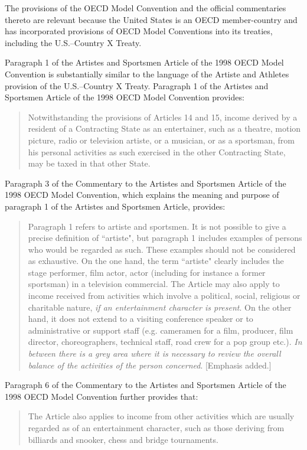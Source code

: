 \begin{select}
The provisions of the OECD Model Convention and the official commentaries
thereto are relevant because the United States is an OECD member-country and
has incorporated provisions of OECD Model Conventions into its treaties, including
the U.S.--Country X Treaty. 

Paragraph 1 of the Artistes and Sportsmen Article of the 1998 OECD Model
Convention is substantially similar to the language of the Artiste and Athletes
provision of the U.S.--Country X Treaty. Paragraph 1 of the Artistes and Sportsmen
Article of the 1998 OECD Model Convention provides:
\begin{quotation}
Notwithstanding the provisions of Articles 14 and 15, income derived by a
resident of a Contracting State as an entertainer, such as a theatre, motion
picture, radio or television artiste, or a musician, or as a sportsman, from his
personal activities as such exercised in the other Contracting State, may be
taxed in that other State. 
\end{quotation}
Paragraph 3 of the Commentary to the Artistes and Sportsmen Article of the 1998
OECD Model Convention, which explains the meaning and purpose of paragraph 1
of the Artistes and Sportsmen Article, provides:
\begin{quotation}
Paragraph 1 refers to artiste and sportsmen. It is not possible to give a
precise definition of ``artiste", but paragraph 1 includes examples of persons
who would be regarded as such. These examples should not be considered
as exhaustive. On the one hand, the term ``artiste" clearly includes the stage
performer, film actor, actor (including for instance a former sportsman) in a
television commercial. The Article may also apply to income received from
activities which involve a political, social, religious or charitable nature, \emph{if an
entertainment character is present}. On the other hand, it does not extend to
a visiting conference speaker or to administrative or support staff (e.g.
cameramen for a film, producer, film director, choreographers, technical staff,
road crew for a pop group etc.). \emph{In between there is a grey area where it is
necessary to review the overall balance of the activities of the person
concerned}. [Emphasis added.]
\end{quotation}

Paragraph 6 of the Commentary to the Artistes and Sportsmen Article of the 1998
OECD Model Convention further provides that:
\begin{quotation}

The Article also applies to income from other activities which are usually
regarded as of an entertainment character, such as those deriving from
billiards and snooker, chess and bridge tournaments.
 \end{quotation}
 

\end{select}
